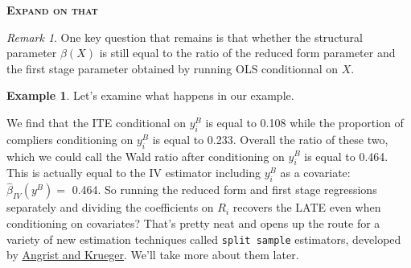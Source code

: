 \documentclass[
]{book}
\newenvironment{Shaded}{\begin{snugshade}}{\end{snugshade}}
\newcommand{\DecValTok}[1]{\textcolor[rgb]{0.00,0.00,0.81}{#1}}
\newcommand{\FunctionTok}[1]{\textcolor[rgb]{0.00,0.00,0.00}{#1}}
\newcommand{\NormalTok}[1]{#1}
\newcommand{\OtherTok}[1]{\textcolor[rgb]{0.56,0.35,0.01}{#1}}
\newcommand{\SpecialCharTok}[1]{\textcolor[rgb]{0.00,0.00,0.00}{#1}}
\theoremstyle{definition}
\theoremstyle{definition}
\newtheorem{example}{Example}[chapter]
\theoremstyle{definition}
\theoremstyle{definition}
\theoremstyle{remark}
\newtheorem*{remark}{Remark}
\begin{document}
\textbf{\textsc{Expand on that}}

\begin{remark}
\iffalse{} {Remark. } \fi{}One key question that remains is that whether the structural parameter \(\beta(X)\) is still equal to the ratio of the reduced form parameter and the first stage parameter obtained by running OLS conditionnal on \(X\).
\end{remark}

\begin{example}
\protect\hypertarget{exm:unnamed-chunk-127}{}{\label{exm:unnamed-chunk-127} }Let's examine what happens in our example.
\end{example}

\begin{Shaded}
\end{Shaded}

We find that the ITE conditional on \(y^B_i\) is equal to 0.108 while the proportion of compliers conditioning on \(y_i^B\) is equal to 0.233.
Overall the ratio of these two, which we could call the Wald ratio after conditioning on \(y_i^B\) is equal to 0.464.
This is actually equal to the IV estimator including \(y_i^B\) as a covariate: \(\hat{\beta}_{IV}(y^B)=\) 0.464.
So running the reduced form and first stage regressions separately and dividing the coefficients on \(R_i\) recovers the LATE even when conditioning on covariates?
That's pretty neat and opens up the route for a variety of new estimation techniques called \texttt{split\ sample} estimators, developed by \href{http://economics.mit.edu/files/398}{Angrist and Krueger}.
We'll take more about them later.
\end{document}
